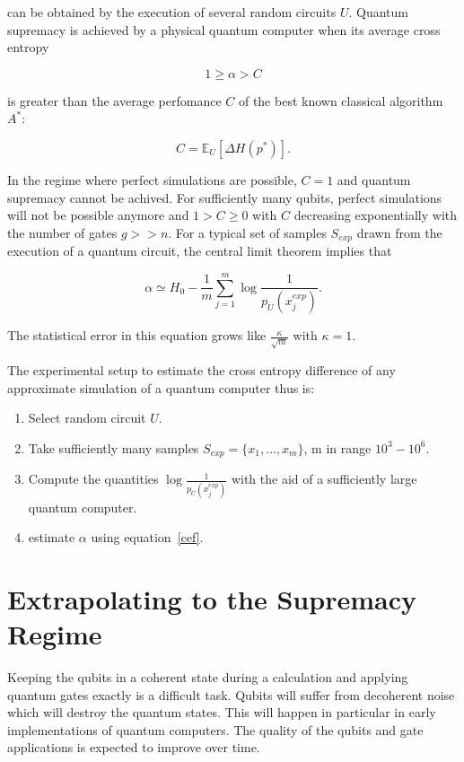 can be obtained by the execution of several random circuits $U$. Quantum
supremacy is achieved by a physical quantum computer when its average cross
entropy

\begin{equation}
  1 \geq \alpha > C
\end{equation}

is greater than the average perfomance $C$ of the best known classical algorithm $A^*$:

\begin{equation}
  C = \mathbb{E}_U[\Delta H(p^*)] .
\end{equation}

In the regime where perfect simulations are possible, $C=1$ and quantum
supremacy cannot be achived. For sufficiently many qubits, perfect simulations
will not be possible anymore and $1 > C \geq 0$ with $C$ decreasing exponentially
with the number of gates $g>>n$. For a typical set of samples $S_{exp}$ drawn from the
execution of a quantum circuit, the central limit theorem implies that

\begin{equation}
  \label{eq:cef}
  \alpha \simeq H_0 - \frac{1}{m} \sum_{j = 1}^m \log{\frac{1}{p_U(x_j^{exp})}}.
\end{equation}

The statistical error in this equation grows like
$\frac{\kappa}{\sqrt{m}}$ with $\kappa=1$.

The experimental setup to estimate the cross entropy difference of any
approximate simulation of a quantum computer thus is:

\begin{enumerate}
\item Select random circuit $U$.
  \item Take sufficiently many samples $S_{exp} = \{x_1, \dots, x_m\}$, m in
    range $10^3-10^6$.
    \item Compute the quantities $\log{\frac{1}{p_U(x_j^{exp})}}$ with the aid
      of a sufficiently large quantum computer.
      \item estimate $\alpha$ using equation~\ref{cef}.
\end{enumerate}

\section{Extrapolating to the Supremacy Regime}

Keeping the qubits in a coherent state during a calculation and applying quantum
gates exactly is a difficult task. Qubits will suffer from decoherent noise
which will destroy the quantum states. This will happen in particular in early
implementations of quantum computers. The quality of the
qubits and gate applications is expected to improve over time.

